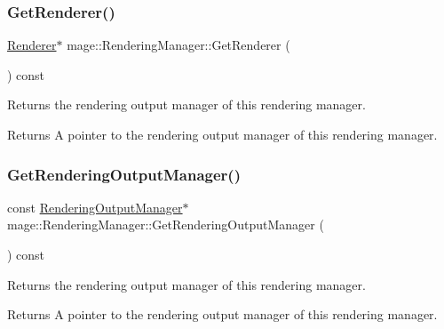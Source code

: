\subsubsection{\texorpdfstring{Get\+Renderer()}{GetRenderer()}}
{\footnotesize\ttfamily \hyperlink{classmage_1_1_renderer}{Renderer}$\ast$ mage\+::\+Rendering\+Manager\+::\+Get\+Renderer (\begin{DoxyParamCaption}{ }\end{DoxyParamCaption}) const\hspace{0.3cm}{\ttfamily [noexcept]}}

Returns the rendering output manager of this rendering manager.

\begin{DoxyReturn}{Returns}
A pointer to the rendering output manager of this rendering manager. 
\end{DoxyReturn}
\hypertarget{classmage_1_1_rendering_manager_ad24d51b141e5579a3bd8fc63793977fe}{}\label{classmage_1_1_rendering_manager_ad24d51b141e5579a3bd8fc63793977fe} 
\subsubsection{\texorpdfstring{Get\+Rendering\+Output\+Manager()}{GetRenderingOutputManager()}}
{\footnotesize\ttfamily const \hyperlink{classmage_1_1_rendering_output_manager}{Rendering\+Output\+Manager}$\ast$ mage\+::\+Rendering\+Manager\+::\+Get\+Rendering\+Output\+Manager (\begin{DoxyParamCaption}{ }\end{DoxyParamCaption}) const\hspace{0.3cm}{\ttfamily [noexcept]}}

Returns the rendering output manager of this rendering manager.

\begin{DoxyReturn}{Returns}
A pointer to the rendering output manager of this rendering manager. 
\end{DoxyReturn}
\hypertarget{classmage_1_1_rendering_manager_a762283c6474287a874f8e8667f69a165}{}\label{classmage_1_1_rendering_manager_a762283c6474287a874f8e8667f69a165} 
